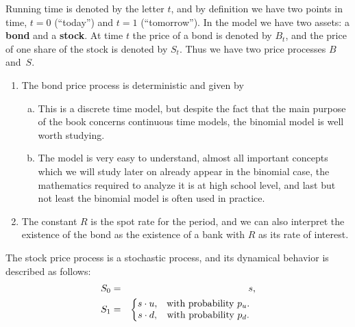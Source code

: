\documentclass{Base}
\begin{document}
Running time is denoted by the letter $t$, and by definition we have two
points in time, $t=0$ (``today'') and $t=1$ (``tomorrow''). In the model we
have two assets: a {\bf bond} and a {\bf stock}. At time $t$ the price of a
bond is denoted by $B_t$, and the price of one share of the stock is denoted
by $S_t$. Thus we have two price processes $B$ and~$S$.
\begin{enumerate}[2.]
\item[1.] The bond price process is deterministic and given by
\begin{enumerate}[b.]
\item[a.]This
is a discrete time model, but despite the fact that the main purpose of the
book concerns continuous time models, the binomial model is well worth
studying.
\item[b.]The model is very easy to understand, almost all important
concepts which we will study later on already  appear in the binomial case,
the mathematics required to analyze it is at high school level, and last but
not least the binomial model is often used in practice.
\end{enumerate}
\item[2.]
The constant $R$ is the spot rate for the period, and we can also interpret
the existence of the bond as the existence of a bank with $R$ as its rate of
interest.
\end{enumerate}
The stock price process is a stochastic process, and its dynamical behavior
is described as follows:
\begin{eqnarray}
S_0&=&s,\\
S_1&=&\left\{\begin{array}{@{}c@{}c}
s \cdot u, &\quad \mbox{with probability $p_u$}.\\
s \cdot d, &\quad \mbox{with probability $p_d$}.
\end{array}
\right.
\end{eqnarray}
\end{document}
